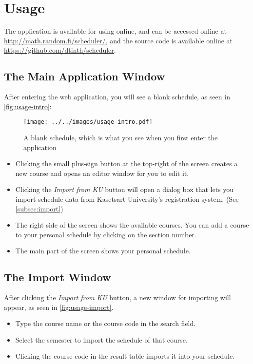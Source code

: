 
\newpage

\section{Usage}

The application is available for using online,
and can be accessed online at \url{http://math.random.fi/scheduler/},
and the source code is available online at \url{https://github.com/dtinth/scheduler}.

\subsection{The Main Application Window}

After entering the web application,
you will see a blank schedule, as seen in \autoref{fig:usage-intro}:

\begin{figure}[h]
  \centering\texttt{[image: ../../images/usage-intro.pdf]}
  \caption{A blank schedule, which is what you see when you first enter the application}
  \label{fig:usage-intro}
\end{figure}

\begin{itemize}
  \item
    Clicking the small plus-sign button at the top-right of the screen
    creates a new course and opens an editor window for you to edit it.
  \item
    Clicking the \emph{Import from KU} button will open a dialog box
    that lets you import schedule data from Kasetsart University's registration system.
    (See \autoref{subsec:import})
  \item
    The right side of the screen shows the available courses.
    You can add a course to your personal schedule by clicking on the section number.
  \item
    The main part of the screen shows your personal schedule.
\end{itemize}


\subsection{The Import Window}
\label{subsec:import}

After clicking the \emph{Import from KU} button,
a new window for importing will appear, as seen in \autoref{fig:usage-import}.

\begin{itemize}
  \item
    Type the course name or the course code in the search field.
  \item
    Select the semester to import the schedule of that course.
  \item
    Clicking the course code in the result table imports it into your schedule.
\end{itemize}

